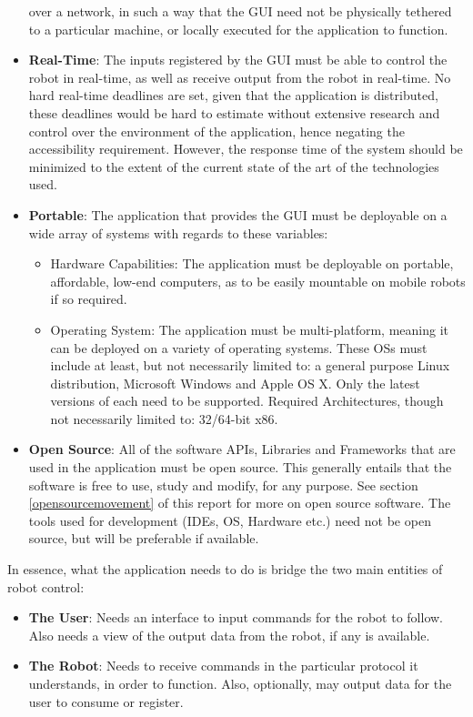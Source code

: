 \begin{itemize}
	over a network, in such a way that the GUI need not be physically tethered to a particular machine, or locally executed 
	for the application to function.
	\item \textbf{Real-Time}: The inputs registered by the GUI must be able to control the robot in real-time, as well as 
	receive output from the robot in real-time. No hard real-time deadlines are set, given that the application is 
	distributed, these deadlines would be hard to estimate without extensive research and control over the environment of 
	the application, hence negating the accessibility requirement. However, the response time of the system should be 
	minimized to the extent of the current state of the art of the technologies used.
	\item \textbf{Portable}: The application that provides the GUI must be deployable on a wide array of systems with 
	regards to these variables:\\
		\begin{itemize}
			\item Hardware Capabilities: The application must be deployable on portable, affordable, low-end computers, as 
			to be easily mountable on mobile robots if so required.
			\item Operating System: The application must be multi-platform, meaning it can be deployed on a variety of 
			operating systems. These OSs must include at least, but not necessarily limited to: a general purpose Linux 
			distribution, Microsoft Windows and Apple OS X. Only the latest versions of each need to be supported. Required 
			Architectures, though not necessarily limited to: 32/64-bit x86.\\
		\end{itemize}
	\item \textbf{Open Source}: All of the software APIs, Libraries and Frameworks that are used in the application must be 
	open source. This generally entails that the software is free to use, study and modify, for any purpose. See section 
	\ref{opensourcemovement} of this report for more on open source software. The tools used for development (IDEs, OS, 
	Hardware etc.) need not be open source, but will be preferable if available.\\
\end{itemize}
In essence, what the application needs to do is bridge the two main entities of robot control:
\begin{itemize}
	\item \textbf{The User}: Needs an interface to input commands for the robot to follow. Also needs a view of the output data from the robot, if any is available.
	\item \textbf{The Robot}: Needs to receive commands in the particular protocol it understands, in order to function. Also, optionally, may output data for the user to consume or register.
\end{itemize}
